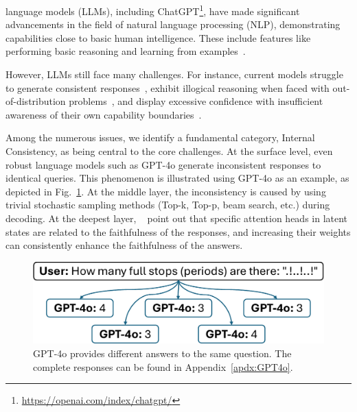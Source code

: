 \documentclass[lettersize,journal]{IEEEtran}
\begin{document}
\noindent {} language models (LLMs), including ChatGPT\footnote{\url{https://openai.com/index/chatgpt/}}, have made significant advancements in the field of natural language processing (NLP), demonstrating capabilities close to basic human intelligence. These include features like performing basic reasoning and learning from examples~\cite{zhao2023survey}.

However, LLMs still face many challenges. For instance, current models struggle to generate consistent responses~\cite{SelfConsistency_23_ICLR_Google}, exhibit illogical reasoning when faced with out-of-distribution problems~\cite{mondorf2024accuracy}, and display excessive confidence with insufficient awareness of their own capability boundaries~\cite{TheoryKnowUnknown_23_ACL_Fudan}.

Among the numerous issues, we identify a fundamental category, Internal Consistency, as being central to the core challenges. At the surface level, even robust language models such as GPT-4o generate inconsistent responses to identical queries. This phenomenon is illustrated using GPT-4o as an example, as depicted in Fig.~\ref{fig:inconsistent_responses}. At the middle layer, the inconsistency is caused by using trivial stochastic sampling methods (Top-k, Top-p, beam search, etc.) during decoding. At the deepest layer, ~\cite{ITI_23_NeuIPS_Harvard, TrFr_24_AAAI_BUAA, TruthX_24_ACL_ICT} point out that specific attention heads in latent states are related to the faithfulness of the responses, and increasing their weights can consistently enhance the faithfulness of the answers.

\IEEEpubidadjcol  %

\begin{figure}[h]
    \centering
    \includegraphics[width=\linewidth]{figures/inconsistent_responses.pdf}
    \caption{GPT-4o provides different answers to the same question. The complete responses can be found in Appendix~\ref{apdx:GPT4o}.}
    \label{fig:inconsistent_responses}
\end{figure}
\end{document}
